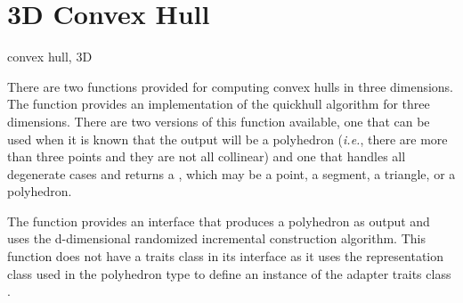 \section{3D Convex Hull}
\begin{ccPackage}{convex hull, 3D}

There are two functions provided for computing convex hulls in three 
dimensions.  The function 
 provides an 
implementation of the quickhull algorithm \cite{bdh-qach-96} for three 
dimensions.  There are two versions of this
function available, one that can be used when it is known that the output
will be a polyhedron (\textit{i.e.}, there are more than three points and
they are not all collinear) and one that handles all degenerate cases
and returns a , which may be a point, a segment, a
triangle, or a polyhedron.

The function 
provides an interface that produces a polyhedron as output and uses the
d-dimensional randomized incremental construction algorithm.  This function
does not have a traits class in its interface as it uses the representation
class  used in the polyhedron type to define an instance of the 
adapter traits class .

\end{ccPackage}

